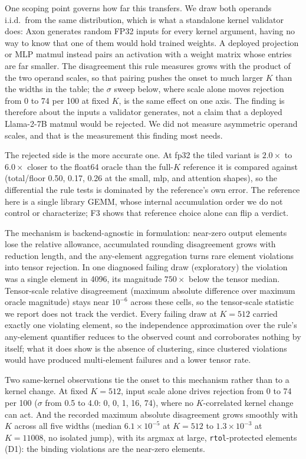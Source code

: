 \documentclass[twocolumn,10pt]{article}
\newcommand{\rtol}{\texttt{rtol}}
\newcommand{\e}[2]{$#1\times10^{#2}$}
\begin{document}
One scoping point governs how far this transfers. We draw both operands
i.i.d.\ from the same distribution, which is what a standalone kernel
validator does: Axon generates random FP32 inputs for every kernel
argument, having no way to know that one of them would hold trained
weights. A deployed projection or MLP matmul instead pairs an activation
with a weight matrix whose entries are far smaller. The disagreement
this rule measures grows with the product of the two operand scales, so
that pairing pushes the onset to much larger $K$ than the widths in the
table; the $\sigma$ sweep below, where scale alone moves rejection from
0 to 74 per 100 at fixed $K$, is the same effect on one axis. The
finding is therefore about the inputs a validator generates, not a claim
that a deployed Llama-2-7B matmul would be rejected. We did not measure
asymmetric operand scales, and that is the measurement this finding most
needs.

The rejected side is the more accurate one. At fp32 the tiled variant is
$2.0\times$ to $6.0\times$ closer to the float64 oracle than the full-$K$
reference it is compared against (total/floor 0.50, 0.17, 0.26 at the
small, mlp, and attention shapes), so the differential the rule tests is
dominated by the reference's own error. The reference here is a single
library GEMM, whose internal accumulation order we do not control or
characterize; F3 shows that reference choice alone can flip a verdict.

The mechanism is backend-agnostic in formulation: near-zero output
elements lose the relative allowance, accumulated rounding disagreement
grows with reduction length, and the any-element aggregation turns rare
element violations into tensor rejection. In one diagnosed failing draw
(exploratory) the violation was a single element in 4096, its magnitude
$750\times$ below the tensor median. Tensor-scale relative disagreement
(maximum absolute difference over maximum oracle magnitude) stays near
$10^{-6}$ across these cells, so the tensor-scale statistic we report
does not track the verdict. Every failing draw at $K{=}512$ carried
exactly one violating element, so the independence approximation over
the rule's any-element quantifier reduces to the observed count and
corroborates nothing by itself; what it does show is the absence of
clustering, since clustered violations would have produced
multi-element failures and a lower tensor rate.

Two same-kernel observations tie the onset to this mechanism rather than
to a kernel change. At fixed $K{=}512$, input scale alone drives
rejection from 0 to 74 per 100 ($\sigma$ from 0.5 to 4.0: 0, 0, 1, 16,
74), where no $K$-correlated kernel change can act. And the recorded
maximum absolute disagreement grows smoothly with $K$ across all five
widths (median \e{6.1}{-5} at $K{=}512$ to \e{1.3}{-3} at $K{=}11008$,
no isolated jump), with its argmax at large, \rtol-protected elements
(D1): the binding violations are the near-zero elements.
\end{document}
